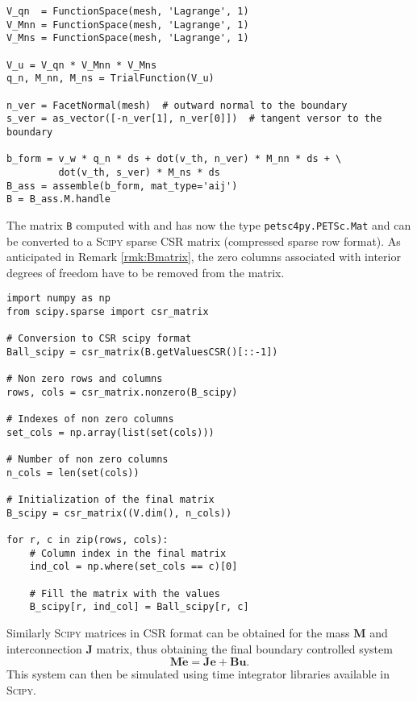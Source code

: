 \begin{tcolorbox}[title = Control matrix construction in  \firedrake, coltitle=black, breakable, size=fbox, boxrule=1pt, pad at break*=1mm, colframe=cyan, enlarge top by=0.25em, enlarge bottom by=0.5em]
\begin{Verbatim}[tabsize=4]
V_qn  = FunctionSpace(mesh, 'Lagrange', 1)
V_Mnn = FunctionSpace(mesh, 'Lagrange', 1)
V_Mns = FunctionSpace(mesh, 'Lagrange', 1)

V_u = V_qn * V_Mnn * V_Mns
q_n, M_nn, M_ns = TrialFunction(V_u)

n_ver = FacetNormal(mesh)  # outward normal to the boundary
s_ver = as_vector([-n_ver[1], n_ver[0]])  # tangent versor to the boundary

b_form = v_w * q_n * ds + dot(v_th, n_ver) * M_nn * ds + \
		 dot(v_th, s_ver) * M_ns * ds
B_ass = assemble(b_form, mat_type='aij')
B = B_ass.M.handle
\end{Verbatim}
\end{tcolorbox}

The matrix \verb|B| computed with \fenics and \firedrake has now the type \verb|petsc4py.PETSc.Mat| and can be converted to a \textsc{Scipy} sparse CSR matrix (compressed sparse row format). As anticipated in Remark \ref{rmk:Bmatrix}, the zero columns associated with interior degrees of freedom have to be removed from the matrix.
\begin{tcolorbox}[title = Construction of the final $\mathbf{B}$ matrix (\textsc{Scipy}), coltitle=white, breakable, size=fbox, boxrule=1pt, pad at break*=1mm, enlarge top by=0.25em, enlarge bottom by=0.5em]
\begin{Verbatim}[tabsize=4]
import numpy as np
from scipy.sparse import csr_matrix

# Conversion to CSR scipy format
Ball_scipy = csr_matrix(B.getValuesCSR()[::-1])

# Non zero rows and columns
rows, cols = csr_matrix.nonzero(B_scipy)

# Indexes of non zero columns
set_cols = np.array(list(set(cols)))

# Number of non zero columns
n_cols = len(set(cols))

# Initialization of the final matrix
B_scipy = csr_matrix((V.dim(), n_cols))

for r, c in zip(rows, cols):
	# Column index in the final matrix
	ind_col = np.where(set_cols == c)[0]
	
	# Fill the matrix with the values
	B_scipy[r, ind_col] = Ball_scipy[r, c]
\end{Verbatim}
\end{tcolorbox}

Similarly \textsc{Scipy} matrices in CSR format can be obtained for the mass $\mathbf{M}$ and interconnection $\mathbf{J}$ matrix, thus obtaining the final boundary controlled system
\begin{equation*}
	\mathbf{M} \dot{\mathbf{e}} = \mathbf{J} \mathbf{e} + \mathbf{B} \mathbf{u}.
\end{equation*}
This system can then be simulated using time integrator libraries available in \textsc{Scipy}.
